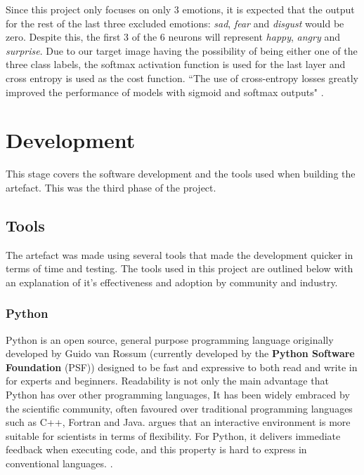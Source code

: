 \documentclass[report, 11pt, oneside]{dissertation}
\begin{document}
Since this project only focuses on only 3 emotions, it is expected that the output for the rest of the last three excluded emotions: \textit{sad}, \textit{fear} and \textit{disgust} would be zero. Despite this, the first 3 of the 6 neurons will represent \textit{happy}, \textit{angry} and \textit{surprise}. Due to our target image having the possibility of being either one of the three class labels, the softmax activation function is used for the last layer and cross entropy is used as the cost function. ``The use of cross-entropy losses greatly improved the performance of models with sigmoid and softmax outputs" \citep[219]{Goodfellow-et-al-2016}. 

\section{Development}

This stage covers the software development and the tools used when building the artefact. This was the third phase of the project.

\subsection{Tools}

The artefact was made using several tools that made the development quicker in terms of time and testing. The tools used in this project are outlined below with an explanation of it's effectiveness and adoption by community and industry.

\subsubsection{Python}

Python is an open source, general purpose programming language originally developed by Guido van Rossum (currently developed by the \textbf{Python Software Foundation} (PSF)) designed to be fast and expressive to both read and write in for experts and beginners. Readability is not only the main advantage that Python has over other programming languages, It has been widely embraced by the scientific community, often favoured over traditional programming languages such as C++, Fortran and Java. \citeauthor{Perez:2011tp} argues that an interactive environment is more suitable for scientists in terms of flexibility. For Python, it delivers immediate feedback when executing code, and this property is hard to express in conventional languages. \citeyearpar[14]{Perez:2011tp}. 
\end{document}
